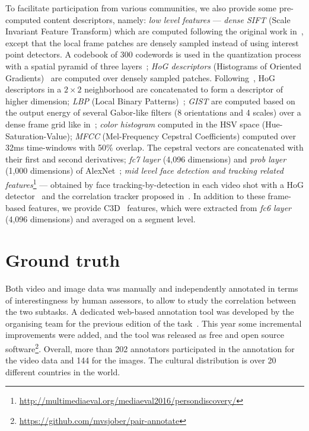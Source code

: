 \documentclass[sigconf]{acmart-me}
\begin{document}
To facilitate participation from various communities, we also
provide some pre-computed content descriptors, namely: \emph{low
level features} --- \emph{dense SIFT} (Scale Invariant Feature
Transform) which are computed following the original work
in~\cite{Lowe2004}, except that the local frame patches are densely
sampled instead of using interest point detectors. A codebook of 300
codewords is used in the quantization process with a spatial pyramid
of three layers~\cite{Lazebnik2006}; \emph{HoG descriptors}
(Histograms of Oriented Gradients)~\cite{Dalal2005} are computed
over densely sampled patches. Following~\cite{Xiao2010}, HoG
descriptors in a $2\times2$ neighborhood are concatenated to form a
descriptor of higher dimension; \emph{LBP} (Local Binary
Patterns)~\cite{Ojala2002}; \emph{GIST} are computed based on the
output energy of several Gabor-like filters (8 orientations and 4
scales) over a dense frame grid like in~\cite{Oliva2001};
\emph{color histogram} computed in the HSV space
(Hue-Saturation-Value); \emph{MFCC} (Mel-Frequency Cepstral
Coefficients) computed over 32ms time-windows with 50\%
overlap. The cepstral vectors are concatenated with their first and
second derivatives; \emph{fc7 layer} (4,096 dimensions) and
\emph{prob layer} (1,000 dimensions) of AlexNet~\cite{Jiang2015};
\emph{mid level face detection and tracking related
features}\footnote{\url{http://multimediaeval.org/mediaeval2016/persondiscovery/}}
--- obtained by face tracking-by-detection in each video shot with a
HoG detector~\cite{Dalal2005} and the correlation tracker proposed
in~\cite{Danelljan2014}. In addition to these frame-based features, we provide C3D~\cite{tran2015learning} features, which were extracted from \emph{fc6 layer} (4,096 dimensions) and averaged on a segment level.


\vspace{-0.2cm}
\section{Ground truth}

Both video and image data was manually and independently annotated in terms of interestingness by human assessors, to allow to study the correlation between the two subtasks.
A dedicated web-based annotation tool was developed by the organising team for the previous edition of the task~\cite{demarty2016mediaeval}. 
This year some incremental improvements were added, and the tool was released as free and open source software\footnote{\url{https://github.com/mvsjober/pair-annotate}}.
Overall, more than 202 annotators participated in the annotation for the video data and 144 for the images.
The cultural distribution is over 20 different countries in the world.
\end{document}
